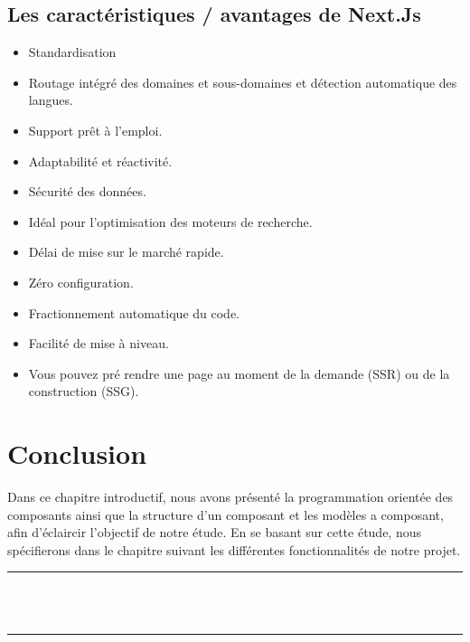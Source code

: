 \documentclass[12pt]{report}
\begin{document}
\newpage

\vspace*{0.1in}

\subsection{Les caractéristiques / avantages de Next.Js}
\vspace{0.1in}

\begin{itemize}
    \item Standardisation
    \item Routage intégré des domaines et sous-domaines et détection automatique des langues.
    \item Support prêt à l’emploi.
    \item Adaptabilité et réactivité.
    \item Sécurité des données.
    \item Idéal pour l’optimisation des moteurs de recherche.
    \item Délai de mise sur le marché rapide.
    \item Zéro configuration.
    \item Fractionnement automatique du code.
    \item Facilité de mise à niveau.
    \item Vous pouvez pré rendre une page au moment de la demande (SSR) ou de la construction (SSG).
\end{itemize}

\section{Conclusion}
\vspace{0.1in}
\indent
Dans ce chapitre introductif, nous avons présenté la programmation orientée des composants ainsi que la structure d’un composant et les modèles a composant, afin d’éclaircir l’objectif de notre étude. En se basant sur cette étude, nous spécifierons dans le chapitre suivant les différentes fonctionnalités de notre projet.

\newpage

\vspace*{\fill}
\begin{center}
    {\color{Blue} \rule{\linewidth}{1.2mm} }\\
\vspace{0.25in}
    {\centering{}}
\vspace{0.35in}\\
    {\color{Blue} \rule{\linewidth}{1.2mm} }
\end{center}
\vspace*{\fill}
\setcounter{section}{0}
\end{document}

